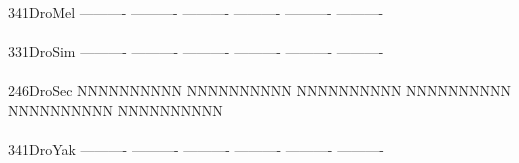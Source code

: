 \documentclass[11pt,twoside,reqno,a4paper]{article}
\begin{document}
{\\
341\hspace*{1\charwidth}DroMel	----------	----------	----------	----------	----------	----------	\\
\hspace*{4\charwidth}\hspace*{7\charwidth}\hspace*{1\charwidth}\hspace*{1\charwidth}\hspace*{1\charwidth}\hspace*{1\charwidth}\hspace*{1\charwidth}\hspace*{1\charwidth}\\
331\hspace*{1\charwidth}DroSim	----------	----------	----------	----------	----------	----------	\\
\hspace*{4\charwidth}\hspace*{7\charwidth}\hspace*{1\charwidth}\hspace*{1\charwidth}\hspace*{1\charwidth}\hspace*{1\charwidth}\hspace*{1\charwidth}\hspace*{1\charwidth}\\
246\hspace*{1\charwidth}DroSec	NNNNNNNNNN	NNNNNNNNNN	NNNNNNNNNN	NNNNNNNNNN	NNNNNNNNNN	NNNNNNNNNN	\\
\hspace*{4\charwidth}\hspace*{7\charwidth}\hspace*{1\charwidth}\hspace*{1\charwidth}\hspace*{1\charwidth}\hspace*{1\charwidth}\hspace*{1\charwidth}\hspace*{1\charwidth}\\
341\hspace*{1\charwidth}DroYak	----------	----------	----------	----------	----------	----------	\\
\hspace*{4\charwidth}\hspace*{7\charwidth}\hspace*{1\charwidth}\hspace*{1\charwidth}\hspace*{1\charwidth}\hspace*{1\charwidth}\hspace*{1\charwidth}\hspace*{1\charwidth}\\
}
\end{document}
